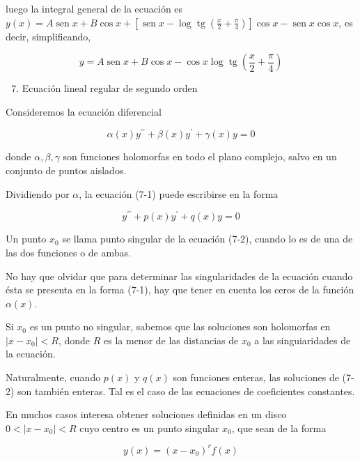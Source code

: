 \documentclass[10pt]{article}
\theoremstyle{plain}
\theoremstyle{definition}
\theoremstyle{remark}
\begin{document}
luego la integral general de la ecuación es\\
$y(x)=A \operatorname{sen} x+B \cos x+\left[\operatorname{sen} x-\log \operatorname{tg}\left(\frac{x}{2}+\frac{\pi}{4}\right)\right] \cos x-\operatorname{sen} x \cos x$, es decir, simplificando,

$$
y=A \operatorname{sen} x+B \cos x-\cos x \log \operatorname{tg}\left(\frac{x}{2}+\frac{\pi}{4}\right)
$$

\begin{enumerate}
  \setcounter{enumi}{6}
  \item Ecuación lineal regular de segundo orden
\end{enumerate}

Consideremos la ecuación diferencial


\begin{equation*}
\alpha(x) y^{\prime \prime}+\beta(x) y^{\prime}+\gamma(x) y=0 \tag{7:1}
\end{equation*}


donde $\alpha, \beta, \gamma$ son funciones holomorfas en todo el plano complejo, salvo en un conjunto de puntos aislados.

Dividiendo por $\alpha$, la ecuación (7-1) puede escribirse en la forma


\begin{equation*}
y^{\prime \prime}+p(x) y^{\prime}+q(x) y=0 \tag{7-2}
\end{equation*}


Un punto $x_{0}$ se llama punto singular de la ecuación (7-2), cuando lo es de una de las dos funciones o de ambas.

No hay que olvidar que para determinar las singularidades de la ecuación cuando ésta se presenta en la forma (7-1), hay que tener en cuenta los ceros de la función $\alpha(x)$.

Si $x_{0}$ es un punto no singular, sabemos que las soluciones son holomorfas en $\left|x-x_{0}\right|<R$, donde $R$ es la menor de las distancias de $x_{0}$ a las singuiaridades de la ecuación.

Naturalmente, cuando $p(x)$ y $q(x)$ son funciones enteras, las soluciones de (7-2) son también enteras. Tal es el caso de las ecuaciones de coeficientes constantes.

En muchos casos interesa obtener soluciones definidas en un disco $0<\left|x-x_{0}\right|<R$ cuyo centro es un punto singular $x_{0}$, que sean de la forma

$$
y(x)=\left(x-x_{0}\right)^{r} f(x)
$$
\end{document}

